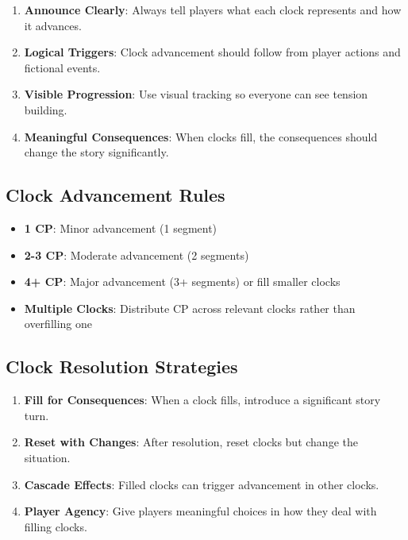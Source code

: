 \begin{enumerate}[leftmargin=*]
\item \textbf{Announce Clearly}: Always tell players what each clock represents and how it advances.
\item \textbf{Logical Triggers}: Clock advancement should follow from player actions and fictional events.
\item \textbf{Visible Progression}: Use visual tracking so everyone can see tension building.
\item \textbf{Meaningful Consequences}: When clocks fill, the consequences should change the story significantly.
\end{enumerate}

\subsection*{Clock Advancement Rules}

\begin{itemize}[leftmargin=*]
\item \textbf{1 CP}: Minor advancement (1 segment)
\item \textbf{2-3 CP}: Moderate advancement (2 segments)  
\item \textbf{4+ CP}: Major advancement (3+ segments) or fill smaller clocks
\item \textbf{Multiple Clocks}: Distribute CP across relevant clocks rather than overfilling one
\end{itemize}

\subsection*{Clock Resolution Strategies}

\begin{enumerate}[leftmargin=*]
\item \textbf{Fill for Consequences}: When a clock fills, introduce a significant story turn.
\item \textbf{Reset with Changes}: After resolution, reset clocks but change the situation.
\item \textbf{Cascade Effects}: Filled clocks can trigger advancement in other clocks.
\item \textbf{Player Agency}: Give players meaningful choices in how they deal with filling clocks.
\end{enumerate}

